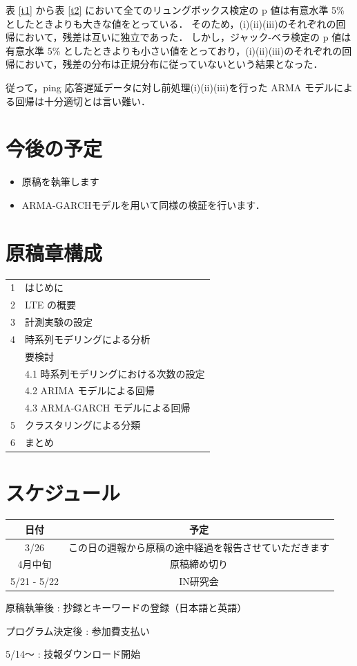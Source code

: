 \documentclass[a4j]{jarticle}
\begin{document}
表 \ref{t1} から表 \ref{t2} において全てのリュングボックス検定の p 値は有意水準 5\% としたときよりも大きな値をとっている．
そのため，(i)(ii)(iii)のそれぞれの回帰において，残差は互いに独立であった．
しかし，ジャック-ベラ検定の p 値は有意水準 5\% としたときよりも小さい値をとっており，(i)(ii)(iii)のそれぞれの回帰において，残差の分布は正規分布に従っていないという結果となった．

従って，ping 応答遅延データに対し前処理(i)(ii)(iii)を行った ARMA モデルによる回帰は十分適切とは言い難い．
\section{今後の予定}
\begin{itemize}
\item 原稿を執筆します
\item ARMA-GARCHモデルを用いて同様の検証を行います．
\end{itemize}
\section{原稿章構成}
\begin{table}[H]
\begin{tabular}{ll}
1&はじめに\\
2& LTE の概要\\
3&計測実験の設定\\
4&時系列モデリングによる分析\\
&要検討\\
&4.1 時系列モデリングにおける次数の設定\\
&4.2 ARIMA モデルによる回帰\\
&4.3 ARMA-GARCH モデルによる回帰\\
5&クラスタリングによる分類\\
6&まとめ
\end{tabular}
\end{table}
\section{スケジュール}
\begin{table}[H]
\begin{tabular}{|c|c|}
\hline
日付&予定\\
\hline
3/26&この日の週報から原稿の途中経過を報告させていただきます\\
\hline
4月中旬&原稿締め切り\\
\hline
5/21 - 5/22&IN研究会\\
\hline
\end{tabular}
\end{table}
原稿執筆後 : 抄録とキーワードの登録（日本語と英語）

プログラム決定後 : 参加費支払い

5/14～ : 技報ダウンロード開始



\end{document}
